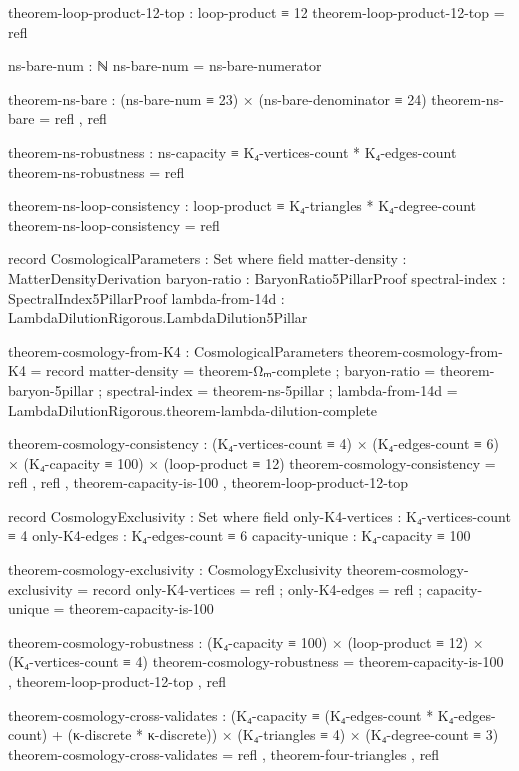 \documentclass[11pt,a4paper]{book}
\begin{document}
\begin{code}
theorem-loop-product-12-top : loop-product ≡ 12
theorem-loop-product-12-top = refl

ns-bare-num : ℕ
ns-bare-num = ns-bare-numerator

theorem-ns-bare : (ns-bare-num ≡ 23) × (ns-bare-denominator ≡ 24)
theorem-ns-bare = refl , refl

theorem-ns-robustness : ns-capacity ≡ K₄-vertices-count * K₄-edges-count
theorem-ns-robustness = refl

theorem-ns-loop-consistency : loop-product ≡ K₄-triangles * K₄-degree-count
theorem-ns-loop-consistency = refl

record CosmologicalParameters : Set where
  field
    matter-density    : MatterDensityDerivation
    baryon-ratio      : BaryonRatio5PillarProof
    spectral-index    : SpectralIndex5PillarProof
    lambda-from-14d   : LambdaDilutionRigorous.LambdaDilution5Pillar

theorem-cosmology-from-K4 : CosmologicalParameters
theorem-cosmology-from-K4 = record
  { matter-density  = theorem-Ωₘ-complete
  ; baryon-ratio    = theorem-baryon-5pillar
  ; spectral-index  = theorem-ns-5pillar
  ; lambda-from-14d = LambdaDilutionRigorous.theorem-lambda-dilution-complete
  }

theorem-cosmology-consistency : (K₄-vertices-count ≡ 4)
                              × (K₄-edges-count ≡ 6)
                              × (K₄-capacity ≡ 100)
                              × (loop-product ≡ 12)
theorem-cosmology-consistency = refl
                              , refl
                              , theorem-capacity-is-100
                              , theorem-loop-product-12-top

record CosmologyExclusivity : Set where
  field
    only-K4-vertices : K₄-vertices-count ≡ 4
    only-K4-edges    : K₄-edges-count ≡ 6
    capacity-unique  : K₄-capacity ≡ 100
    
theorem-cosmology-exclusivity : CosmologyExclusivity
theorem-cosmology-exclusivity = record
  { only-K4-vertices = refl
  ; only-K4-edges    = refl
  ; capacity-unique  = theorem-capacity-is-100
  }

theorem-cosmology-robustness : (K₄-capacity ≡ 100)
                             × (loop-product ≡ 12)
                             × (K₄-vertices-count ≡ 4)
theorem-cosmology-robustness = theorem-capacity-is-100
                             , theorem-loop-product-12-top
                             , refl

theorem-cosmology-cross-validates : (K₄-capacity ≡ (K₄-edges-count * K₄-edges-count) + (κ-discrete * κ-discrete))
                                  × (K₄-triangles ≡ 4)
                                  × (K₄-degree-count ≡ 3)
theorem-cosmology-cross-validates = refl , theorem-four-triangles , refl


\end{code}
\end{document}

